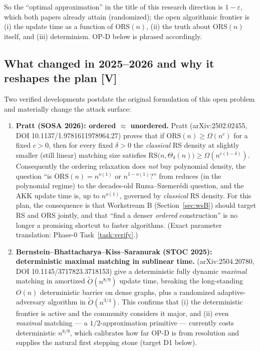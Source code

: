 \documentclass[11pt]{article}
\theoremstyle{definition}
\theoremstyle{remark}
\newcommand{\statusV}{\textcolor{green!45!black}{\textsf{[V]}}}
\newcommand{\ORS}{\mathrm{ORS}}
\newcommand{\RS}{\mathrm{RS}}
\newcommand{\eps}{\varepsilon}
\newcommand{\Otil}{\widetilde{O}}
\begin{document}
So the ``optimal approximation'' in the title of this research direction
is $1-\eps$, which both papers already attain (randomized); the open
algorithmic frontier is (i) the update time as a function of $\ORS(n)$,
(ii) the truth about $\ORS(n)$ itself, and (iii) determinism. OP-D below
is phrased accordingly.

\subsection{What changed in 2025--2026 and why it reshapes the plan \statusV}
\label{sec:newdev}

Two verified developments postdate the original formulation of this open
problem and materially change the attack surface:

\begin{enumerate}[itemsep=3pt]
\item \textbf{Pratt (SOSA 2026): ordered $\approx$ unordered.}
Pratt \cite{Pra26} (arXiv:2502.02455, DOI 10.1137/1.9781611978964.27)
proves that if $\ORS(n)\ge \Omega(n^{c})$ for a fixed $c>0$, then for
every fixed $\delta>0$ the \emph{classical} RS density at slightly smaller
(still linear) matching size satisfies
$\RS\big(n,\Theta_{\delta}(n)\big)\ge \Omega(n^{c(1-\delta)})$.
Consequently the ordering relaxation does \emph{not} buy polynomial
density, the question ``is $\ORS(n)=n^{o(1)}$ or $n^{1-o(1)}$?'' from
\cite{BG24} reduces (in the polynomial regime) to the decades-old
Ruzsa--Szemer\'edi question, and the AKK update time is, up to
$n^{o(1)}$, governed by \emph{classical} RS density. For this plan, the
consequence is that Workstream B (Section~\ref{sec:wsB}) should target RS
and ORS jointly, and that ``find a denser \emph{ordered} construction''
is no longer a promising shortcut to faster algorithms. (Exact parameter
translation: Phase-0 Task~\ref{task:verify}.)
\item \textbf{Bernstein--Bhattacharya--Kiss--Saranurak (STOC 2025):
deterministic maximal matching in sublinear time.} \cite{BBKS25}
(arXiv:2504.20780, DOI 10.1145/3717823.3718153) give a deterministic
fully dynamic \emph{maximal} matching in amortized $\Otil(n^{8/9})$
update time, breaking the long-standing $O(n)$ deterministic barrier on
dense graphs, plus a randomized adaptive-adversary algorithm in
$\Otil(n^{3/4})$. This confirms that (i) the deterministic frontier is
active and the community considers it major, and (ii) even
\emph{maximal} matching --- a $1/2$-approximation primitive ---
currently costs deterministic $n^{8/9}$, which calibrates how far OP-D
is from resolution and supplies the natural first stepping stone
(target D1 below).
\end{enumerate}
\end{document}
